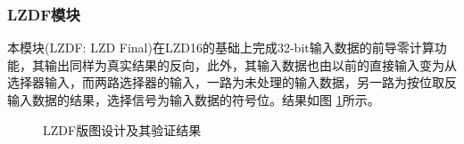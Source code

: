 \subsubsection{LZDF模块}
本模块(LZDF: LZD Final)在LZD16的基础上完成32-bit输入数据的前导零计算功能，其输出同样为真实结果的反向，此外，其输入数据也由以前的直接输入变为从选择器输入，而两路选择器的输入，一路为未处理的输入数据，另一路为按位取反输入数据的结果，选择信号为输入数据的符号位。结果如图
\ref{fig5.6}所示。
\begin{figure}[!hbtp]
\centering
{}
\caption{LZDF版图设计及其验证结果}
\label{fig5.6}
\end{figure}

